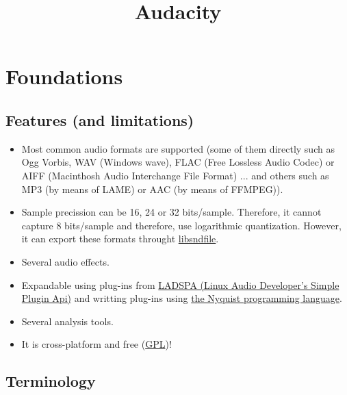 \title{Audacity}

\maketitle
\tableofcontents

\chapter{Foundations}

\section{Features (and limitations)}

\begin{itemize}
\item Most common audio formats are supported (some of them directly
  such as Ogg Vorbis, WAV (Windows wave), FLAC (Free Lossless Audio
  Codec) or AIFF (Macinthosh Audio Interchange File Format) ... and
  others such as MP3 (by means of LAME) or AAC (by means of FFMPEG)).
\item Sample precission can be 16, 24 or 32 bits/sample. Therefore, it
  cannot capture 8 bits/sample and therefore, use logarithmic
  quantization. However, it can export these formats throught
  \href{http://www.mega-nerd.com/libsndfile/}{libsndfile}.
\item Several audio effects.
\item Expandable using plug-ins from
  \href{http://www.ladspa.org/}{LADSPA (Linux Audio Developer's Simple
    Plugin Api)} and writting plug-ins using
  \href{http://manual.audacityteam.org/o/man/nyquist_prompt.html}{the
    Nyquist programming language}.
\item Several analysis tools.
\item It is cross-platform and free
  (\href{http://audacity.sourceforge.net/about/license}{GPL})!
\end{itemize}

\section{Terminology}

